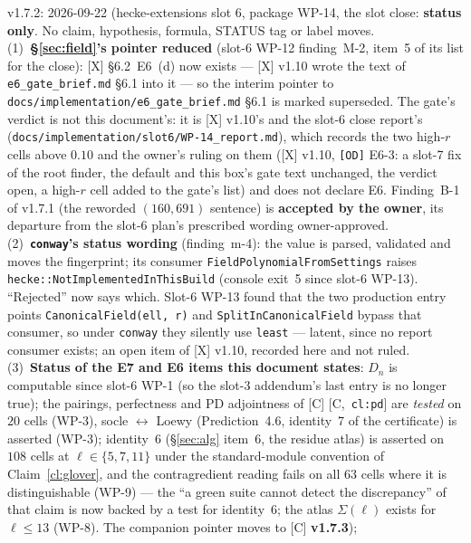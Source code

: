 \documentclass[11pt]{article}
\theoremstyle{remark}
\newcommand{\Dn}{D_n}
\newcommand{\HA}[1]{[C,~\texttt{#1}]}      %
\begin{document}
v1.7.2: 2026-09-22 (hecke-extensions slot 6, package WP-14, the slot close:
\textbf{status only}. No claim, hypothesis, formula, STATUS tag or label moves.
(1)~\textbf{\S\ref{sec:field}'s pointer reduced} (slot-6 WP-12 finding~M-2, item~5 of its list
for the close): [X] \S6.2~E6~(d) now exists --- [X] v1.10 wrote the text of \texttt{e6\_gate\_brief.md} \S6.1 into it ---
so the interim pointer to \texttt{docs/implementation/e6\_gate\_brief.md} \S6.1 is marked
superseded. The gate's verdict is not this document's: it is [X] v1.10's and the slot-6 close
report's (\texttt{docs/implementation/slot6/WP-14\_report.md}), which records the two high-$r$
cells above $0.10$ and the owner's ruling on them ([X] v1.10, \texttt{[OD]} E6-3: a slot-7 fix of
the root finder, the default and this box's gate text unchanged, the verdict open, a high-$r$
cell added to the gate's list) and does not declare E6. Finding~B-1 of v1.7.1 (the reworded
$(160,691)$ sentence) is \textbf{accepted by the owner}, its departure from the slot-6 plan's
prescribed wording owner-approved.
(2)~\textbf{\texttt{conway}'s status wording} (finding~m-4): the value is parsed, validated and
moves the fingerprint; its consumer \texttt{FieldPolynomialFromSettings} raises
\texttt{hecke::NotImplementedInThisBuild} (console exit~5 since slot-6 WP-13). ``Rejected''
now says which. Slot-6 WP-13 found that the two production entry points
\texttt{CanonicalField(ell, r)} and \texttt{SplitInCanonicalField} bypass that consumer, so under
\texttt{conway} they silently use \texttt{least} --- latent, since no report consumer exists; an
open item of [X] v1.10, recorded here and not ruled.
(3)~\textbf{Status of the E7 and E6 items this document states}: $\Dn$ is computable since
slot-6 WP-1 (so the slot-3 addendum's last entry is no longer true); the pairings,
perfectness and PD adjointness of [C] \HA{cl:pd} are \emph{tested} on $20$ cells (WP-3),
socle $\leftrightarrow$ Loewy (Prediction~4.6, identity~7 of the certificate) is asserted
(WP-3); identity~6 (\S\ref{sec:alg} item~6, the residue atlas) is asserted on $108$ cells at
$\ell\in\{5,7,11\}$ under the standard-module convention of Claim~\ref{cl:glover}, and the
contragredient reading fails on all $63$ cells where it is distinguishable (WP-9) --- the
``a green suite cannot detect the discrepancy'' of that claim is now backed by a test for
identity~6; the atlas $\Sigma(\ell)$ exists for $\ell\le13$ (WP-8).
The companion pointer moves to [C] \textbf{v1.7.3});
\end{document}
